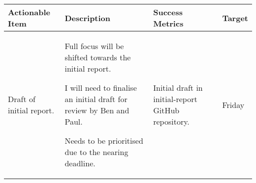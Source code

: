 \begin{table}[!h]
    \centering
    \begin{tabularx}{\textwidth}{|X|X|X|l|}
        \hline
        Actionable Item & Description & Success Metrics & Target \\
        \hline
        \hline
        Draft of initial report. &
        \begin{myitemize}
            \item Full focus will be shifted towards the initial report.
            \item I will need to finalise an initial draft for review by Ben and Paul.
            \item Needs to be prioritised due to the nearing deadline.
        \end{myitemize} &
        \begin{myitemize}
            \item Initial draft in initial-report GitHub repository.
        \end{myitemize} &
        Friday \\
        \hline
    \end{tabularx}
\end{table}
